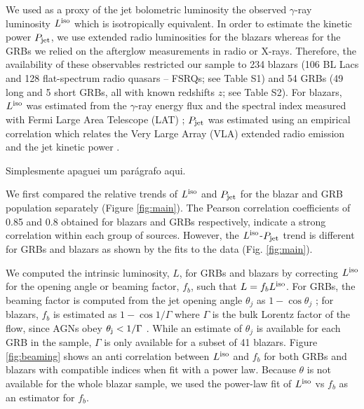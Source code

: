 \documentclass[12pt]{article}
\begin{document}
We used as a proxy of the jet bolometric luminosity the observed $\gamma$-ray luminosity $L^{\rm iso}$ which is isotropically equivalent. In order to estimate the kinetic power $P_{\rm jet}$, we use extended radio luminosities for the blazars whereas for the GRBs we relied on the afterglow measurements in radio or X-rays. Therefore, the availability of these observables restricted our sample to 234 blazars (106 BL Lacs and 128 flat-spectrum radio quasars -- FSRQs; see Table S1) and 54 GRBs (49 long and 5 short GRBs, all with known redshifts $z$; see Table S2). 
For blazars, $L^{\rm iso}$ was estimated from the $\gamma$-ray energy flux and the spectral index measured with Fermi Large Area Telescope (LAT) \cite{2lac}; $P_{\rm jet}$ was estimated using an empirical correlation which relates the Very Large Array (VLA) extended radio emission and the jet kinetic power \cite{cava10,meyer11}. 

Simplesmente apaguei um parágrafo aqui.



We first compared the relative trends of $L^{\rm iso}$ and $P_{\rm jet}$ for the blazar and GRB population separately (Figure \ref{fig:main}). The Pearson correlation coefficients of 0.85 and 0.8 obtained for blazars and GRBs respectively, indicate a strong correlation within each group of sources. However, the $L^{\rm iso}$-$P_{\rm jet}$ trend is different for GRBs and blazars as shown by the fits to the data (Fig. \ref{fig:main}). 

We computed the intrinsic luminosity, $L$, for GRBs and blazars by correcting  $L^{\rm iso}$ for the opening angle or beaming factor, $f_b$, such that $L = f_b L^{\rm iso}$. For GRBs, the beaming factor is computed from the jet opening angle $\theta_j$ as $1-\cos \theta_j$ \cite{frail01}; for blazars, $f_b$ is estimated as $1-\cos 1/\Gamma$ where $\Gamma$ is the bulk Lorentz factor of the flow, since AGNs obey $\theta_{\rm j}<1/\Gamma$ \cite{jorstad05,push09}.
While an estimate of $\theta_j$ is available for each GRB in the sample, $\Gamma$ is only available for a subset of 41 blazars. Figure \ref{fig:beaming} shows an anti correlation between $L^{\rm iso}$ and $f_b$ for both GRBs and blazars with compatible indices when fit with a power law. Because $\theta$ is not available for the whole blazar sample, we used the power-law fit of $L^{\rm iso}$ vs $f_b$ as an estimator for $f_b$.
\end{document}
